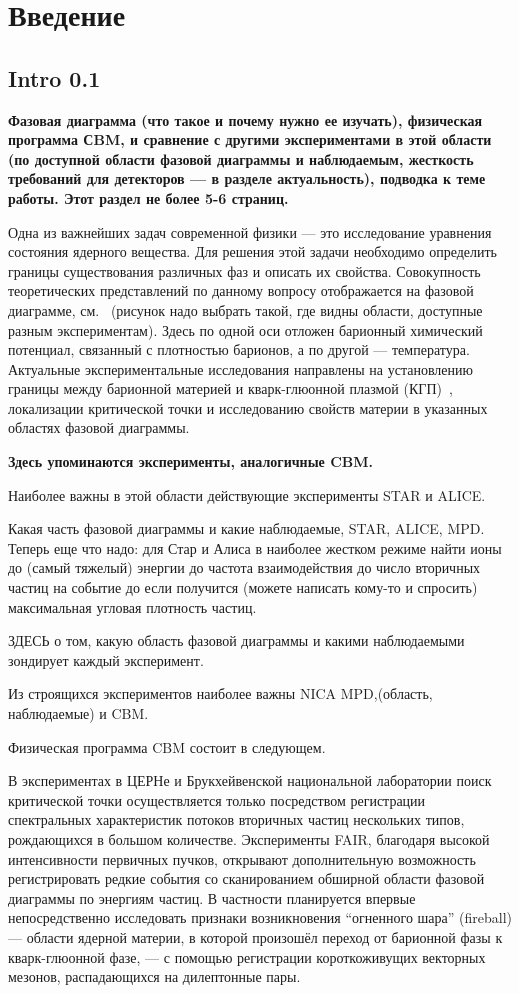 \chapter*{Введение}\label{sec:secIntro}

\section*{Intro 0.1}
\textbf{Фазовая диаграмма (что такое и почему нужно ее изучать), физическая программа СBM, и сравнение с другими экспериментами в этой области (по доступной области фазовой диаграммы и наблюдаемым, жесткость требований для детекторов --- в разделе актуальность), подводка к теме работы. Этот раздел не более 5-6 страниц.}

Одна из важнейших задач современной физики --- это исследование уравнения состояния ядерного вещества. Для решения этой задачи необходимо определить границы существования различных фаз и описать их свойства. Совокупность теоретических представлений по данному вопросу отображается на фазовой диаграмме, см.~\figref{} (рисунок надо выбрать такой, где видны области, доступные разным экспериментам). Здесь по одной оси отложен барионный химический потенциал, связанный с плотностью барионов, а по другой --- температура. Актуальные экспериментальные исследования направлены на установлению границы между барионной материей и кварк-глюонной плазмой (КГП)~\cite{}, локализации критической точки и исследованию свойств материи в указанных областях фазовой диаграммы.

\todo \textbf{Здесь упоминаются эксперименты, аналогичные CBM.}

Наиболее важны в этой области действующие эксперименты STAR и ALICE.

Какая часть фазовой диаграммы и какие наблюдаемые, STAR, ALICE, MPD.
Теперь еще что надо:
для Стар и Алиса в наиболее жестком режиме найти
ионы до (самый тяжелый)
энергии до
частота взаимодействия до
число вторичных частиц на событие до
если получится (можете написать кому-то и спросить) максимальная угловая плотность частиц.

ЗДЕСЬ о том, какую область фазовой диаграммы и какими наблюдаемыми зондирует каждый эксперимент.

Из строящихся экспериментов наиболее важны NICA MPD,(область, наблюдаемые) и CBM.

Физическая программа CBM состоит в следующем.


В экспериментах в ЦЕРНе и Брукхейвенской национальной лаборатории поиск критической точки осуществляется только посредством регистрации спектральных характеристик потоков вторичных частиц нескольких типов, рождающихся в большом количестве. Эксперименты FAIR, благодаря высокой интенсивности первичных пучков, открывают дополнительную возможность регистрировать редкие события со сканированием обширной области фазовой диаграммы по энергиям частиц. В частности планируется впервые непосредственно исследовать признаки возникновения ``огненного шара'' (fireball) --- области ядерной материи, в которой произошёл переход от барионной фазы к кварк-глюонной фазе, --- с помощью регистрации короткоживущих векторных мезонов, распадающихся на дилептонные пары.

